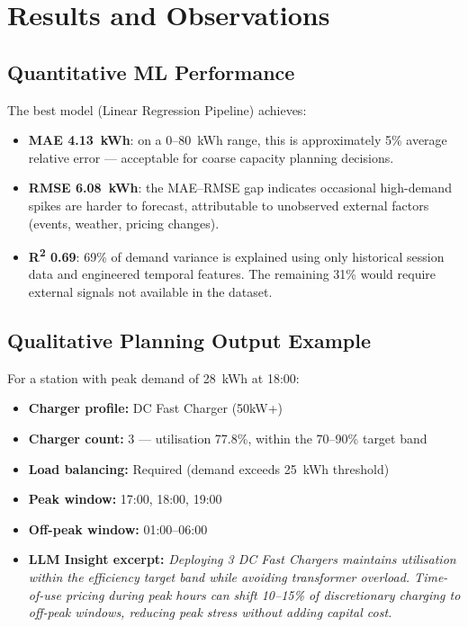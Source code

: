 \documentclass[12pt,a4paper]{article}
\begin{document}
\section{Results and Observations}
\label{sec:results}

\subsection{Quantitative ML Performance}

The best model (Linear Regression Pipeline) achieves:

\begin{itemize}[leftmargin=*]
  \item \textbf{MAE 4.13~kWh}: on a 0–80~kWh range, this is approximately 5\%
    average relative error — acceptable for coarse capacity planning decisions.
  \item \textbf{RMSE 6.08~kWh}: the MAE–RMSE gap indicates occasional high-demand
    spikes are harder to forecast, attributable to unobserved external factors
    (events, weather, pricing changes).
  \item \textbf{R\textsuperscript{2} 0.69}: 69\% of demand variance is explained
    using only historical session data and engineered temporal features. The remaining
    31\% would require external signals not available in the dataset.
\end{itemize}

\subsection{Qualitative Planning Output Example}

For a station with peak demand of 28~kWh at 18:00:

\begin{itemize}[leftmargin=*]
  \item \textbf{Charger profile:} DC Fast Charger (50kW+)
  \item \textbf{Charger count:} 3 — utilisation 77.8\%, within the 70–90\% target band
  \item \textbf{Load balancing:} Required (demand exceeds 25~kWh threshold)
  \item \textbf{Peak window:} 17:00, 18:00, 19:00
  \item \textbf{Off-peak window:} 01:00–06:00
  \item \textbf{LLM Insight excerpt:} \textit{Deploying 3 DC Fast Chargers maintains
    utilisation within the efficiency target band while avoiding transformer overload.
    Time-of-use pricing during peak hours can shift 10–15\% of discretionary charging
    to off-peak windows, reducing peak stress without adding capital cost.}
\end{itemize}
\end{document}
